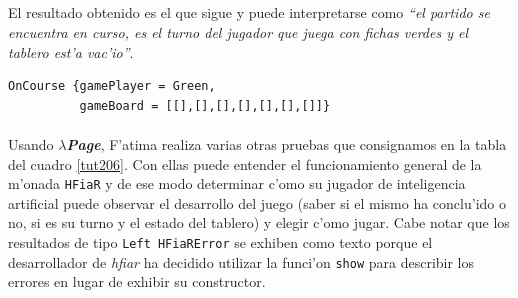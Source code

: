 \documentclass[a4paper]{article}
\newcommand{\hpage}{\textbf{\textsl{$\lambda$Page}}}
\begin{document}
\subparagraph{}El resultado obtenido es el que sigue y puede interpretarse como \textsl{``el partido se encuentra en curso, es el turno del jugador que juega con fichas verdes y el tablero est'a vac'io''}.
\begin{center}\begin{lstlisting}
OnCourse {gamePlayer = Green,
          gameBoard = [[],[],[],[],[],[],[]]}
\end{lstlisting}\end{center}
\newpage
\paragraph{}Usando \hpage, F'atima realiza varias otras pruebas que consignamos en la tabla del cuadro \ref{tut206}.  Con ellas puede entender el funcionamiento general de la m'onada \texttt{HFiaR} y de ese modo determinar c'omo su jugador de inteligencia artificial puede observar el desarrollo del juego (saber si el mismo ha conclu'ido o no, si es su turno y el estado del tablero) y elegir c'omo jugar.  Cabe notar que los resultados de tipo \texttt{Left HFiaRError} se exhiben como texto porque el desarrollador de \textsl{hfiar} ha decidido utilizar la funci'on \texttt{show} para describir los errores en lugar de exhibir su constructor.
\end{document}
